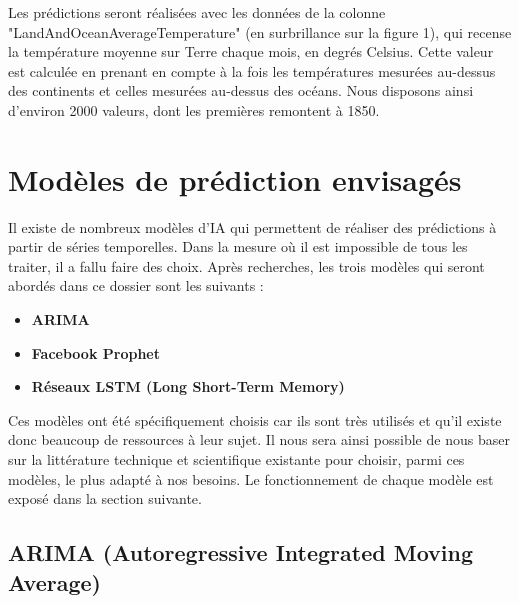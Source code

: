\documentclass[french]{article}
\begin{document}
    Les prédictions seront réalisées avec les données de la colonne "LandAndOceanAverageTemperature" (en surbrillance sur la figure 1), qui recense la température moyenne sur Terre chaque mois, en degrés Celsius. Cette valeur est calculée en prenant en compte à la fois les températures mesurées au-dessus des continents et celles mesurées au-dessus des océans. Nous disposons ainsi d'environ 2000 valeurs, dont les premières remontent à 1850.
    \section{Modèles de prédiction envisagés}

    Il existe de nombreux modèles d'IA qui permettent de réaliser des prédictions à partir de séries temporelles. Dans la mesure où il est impossible de tous les traiter, il a fallu faire des choix. Après recherches, les trois modèles qui seront abordés dans ce dossier sont les suivants :
    \begin{itemize}
        \item \textbf{ARIMA}
        \item \textbf{Facebook Prophet}
        \item \textbf{Réseaux LSTM (Long Short-Term Memory)}
    \end{itemize} 
    
    Ces modèles ont été spécifiquement choisis car ils sont très utilisés et qu'il existe donc beaucoup de ressources à leur sujet. Il nous sera ainsi possible de nous baser sur la littérature technique et scientifique existante pour choisir, parmi ces modèles, le plus adapté à nos besoins. Le fonctionnement de chaque modèle est exposé dans la section suivante.

    \subsection{ARIMA (Autoregressive Integrated Moving Average)}
\end{document}
